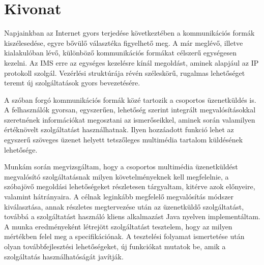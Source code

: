 
\section*{Kivonat}

Napjainkban az Internet gyors terjedése következtében a kommunikációs formák kiszélesedése, egyre bővülő választéka figyelhető meg. A már meglévő, illetve kialakulóban lévő, különböző kommunikációs formákat célszerű egységesen kezelni. Az IMS erre az egységes kezelésre kínál megoldást, aminek alapjául az IP protokoll szolgál. Vezérlési struktúrája révén széleskörű, rugalmas lehetőséget teremt új szolgáltatások gyors bevezetésére.

A szóban forgó kommunikációs formák közé tartozik a csoportos üzenetküldés is. A felhasználók gyorsan, egyszerűen, lehetőség szerint integrált megvalósításokkal szeretnének információkat megosztani az ismerőseikkel, aminek során valamilyen értéknövelt szolgáltatást használhatnak. Ilyen hozzáadott funkció lehet az egyszerű szöveges üzenet helyett tetszőleges multimédia tartalom küldésének lehetősége.

Munkám során megvizsgáltam, hogy a csoportos multimédia üzenetküldést megvalósító szolgáltatásnak milyen követelményeknek kell megfelelnie, a szóbajövő megoldási lehetőségeket részletesen tárgyaltam, kitérve azok előnyeire, valamint hátrányaira. A célnak leginkább megfelelő megvalósítás módszer kiválasztása, annak részletes megtervezése után az üzenetküldő szolgáltatást, továbbá a szolgáltatást használó kliens alkalmazást Java nyelven implementáltam. A munka eredményeként létrejött szolgáltatást tesztelem, hogy az milyen mértékben felel meg a specifikációnak. A tesztelési folyamat ismertetése után olyan továbbfejlesztési lehetőségeket, új funkciókat mutatok be, amik a szolgáltatás használhatóságát javítják.
